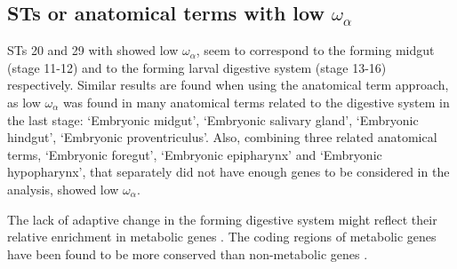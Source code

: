 \subsection{STs or anatomical terms with low $\omega_{\alpha}$}
STs 20 and 29 with showed low $\omega_{\alpha}$, seem to correspond to the forming midgut (stage 11-12) and to the forming larval digestive system (stage 13-16) respectively.
Similar results are found when using the anatomical term approach, as low $\omega_{\alpha}$ was found in many anatomical terms related to the digestive system in the last stage: `Embryonic midgut', `Embryonic salivary gland', `Embryonic hindgut', `Embryonic proventriculus'. 
Also, combining three related anatomical terms, `Embryonic foregut', `Embryonic epipharynx' and `Embryonic hypopharynx', that separately did not have enough genes to be considered in the analysis, showed low $\omega_{\alpha}$. 

The lack of adaptive change in the forming digestive system might reflect their relative enrichment in metabolic genes \citep{Marianes2013}. The coding regions of metabolic genes have been found to be more conserved than non-metabolic genes \citep{Peregrin-Alvarez2009}.


